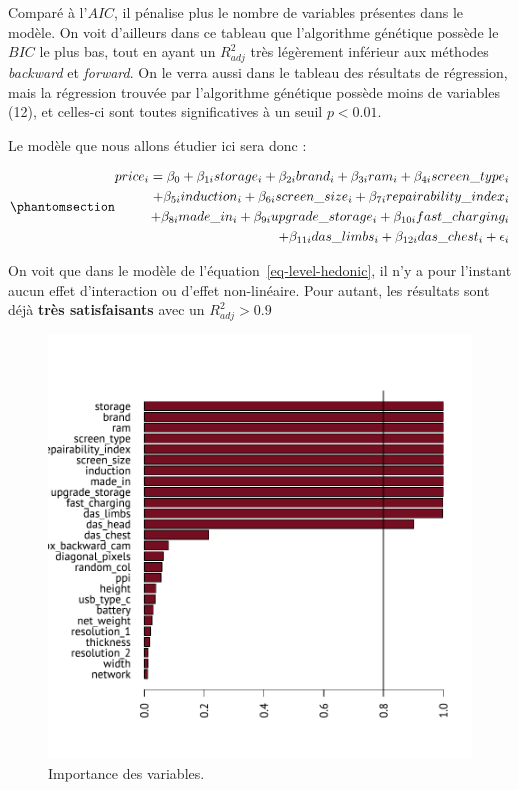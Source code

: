 \documentclass[
  12pt,
]{report}
\begin{document}
Comparé à l'\(AIC\), il pénalise plus le nombre de variables présentes
dans le modèle. On voit d'ailleurs dans ce tableau que l'algorithme
génétique possède le \(BIC\) le plus bas, tout en ayant un \(R^2_{adj}\)
très légèrement inférieur aux méthodes \emph{backward} et
\emph{forward}. On le verra aussi dans le tableau des résultats de
régression, mais la régression trouvée par l'algorithme génétique
possède moins de variables (12), et celles-ci sont toutes significatives
à un seuil \(p<0.01\).

Le modèle que nous allons étudier ici sera donc :

\begin{equation}\phantomsection\label{eq-level-hedonic}{
\begin{split}
price_i = \beta_0 + \beta_{1i} storage_i + \beta_{2i}brand_i + \beta_{3i}ram_i + \beta_{4i}screen\_type_i \\
+ \beta_{5i}induction_i + \beta_{6i}screen\_size_i + \beta_{7i}repairability\_index_i \\
+ \beta_{8i}made\_in_i + \beta_{9i}upgrade\_storage_i + \beta_{10i}fast\_charging_i  \\
+ \beta_{11i}das\_limbs_i + \beta_{12i}das\_chest_i + \epsilon_i
\end{split}
}\end{equation}

On voit que dans le modèle de l'équation~\ref{eq-level-hedonic}, il n'y
a pour l'instant aucun effet d'interaction ou d'effet non-linéaire. Pour
autant, les résultats sont déjà \textbf{très satisfaisants} avec un
\(R^2_{adj} > 0.9\)

\newpage

\begin{figure}[H]

{\centering \includegraphics{report_files/figure-pdf/var_importance-1.pdf}

}

\caption{Importance des variables.}

\end{figure}%
\end{document}
